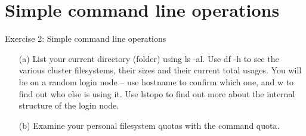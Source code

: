 \documentclass[handout]{beamer} %
\begin{document}
{
\section{Simple command line operations}
%
\begin{frame}{Exercise 2: Simple command line operations}
\begin{itemize}

\item[(a)]{List your current directory (folder) using \alert{ls -al}. Use \alert{df -h} to see the various cluster filesystems, their sizes and their current total usages. You will be on a random login node -- use \alert{hostname} to confirm which one, and \alert{w} to find out who else is using it. Use \alert{lstopo} to find out more about the internal structure of the login node.}

\item[(b)]{Examine your personal filesystem quotas with the command \alert{quota}.}

\end{itemize}
\end{frame}
}
\end{document}
